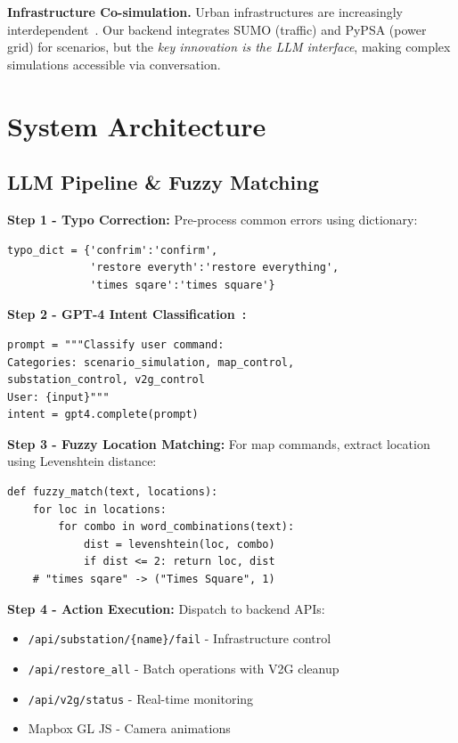 \documentclass[sigconf]{acmart}
\begin{document}
\textbf{Infrastructure Co-simulation.} Urban infrastructures are increasingly interdependent~\cite{pypsa2018,lopez2018}. Our backend integrates SUMO (traffic) and PyPSA (power grid) for scenarios, but the \textit{key innovation is the LLM interface}, making complex simulations accessible via conversation.

\section{System Architecture}

\subsection{LLM Pipeline \& Fuzzy Matching}

\textbf{Step 1 - Typo Correction:} Pre-process common errors using dictionary:
\begin{verbatim}
typo_dict = {'confrim':'confirm',
             'restore everyth':'restore everything',
             'times sqare':'times square'}
\end{verbatim}

\textbf{Step 2 - GPT-4 Intent Classification~\cite{achiam2023gpt}:}
\begin{verbatim}
prompt = """Classify user command:
Categories: scenario_simulation, map_control,
substation_control, v2g_control
User: {input}"""
intent = gpt4.complete(prompt)
\end{verbatim}

\textbf{Step 3 - Fuzzy Location Matching:} For map commands, extract location using Levenshtein distance:
\begin{verbatim}
def fuzzy_match(text, locations):
    for loc in locations:
        for combo in word_combinations(text):
            dist = levenshtein(loc, combo)
            if dist <= 2: return loc, dist
    # "times sqare" -> ("Times Square", 1)
\end{verbatim}

\textbf{Step 4 - Action Execution:} Dispatch to backend APIs:
\begin{itemize}
    \item \texttt{/api/substation/\{name\}/fail} - Infrastructure control
    \item \texttt{/api/restore\_all} - Batch operations with V2G cleanup
    \item \texttt{/api/v2g/status} - Real-time monitoring
    \item Mapbox GL JS - Camera animations
\end{itemize}
\end{document}
